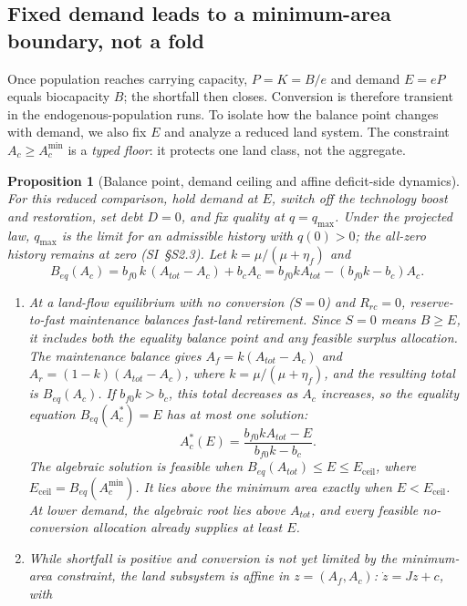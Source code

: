 \documentclass[preprint,12pt,authoryear]{elsarticle}
\newtheorem{proposition}{Proposition}
\newcommand{\Eceil}{E_{\mathrm{ceil}}}
\newcommand{\Acmin}{A_c^{\min}}
\begin{document}
\subsection{Fixed demand leads to a minimum-area boundary, not a fold}\label{sec:ceiling}

Once population reaches carrying capacity, $P=K=B/e$ and demand $E=eP$ equals biocapacity $B$; the shortfall then closes. Conversion is therefore transient in the endogenous-population runs. To isolate how the balance point changes with demand, we also fix $E$ and analyze a reduced land system. The constraint $A_c\ge\Acmin$ is a \emph{typed floor}: it protects one land class, not the aggregate.

\begin{proposition}[Balance point, demand ceiling and affine deficit-side dynamics]\label{prop:ceiling}
For this reduced comparison, hold demand at $E$, switch off the technology boost and restoration, set debt $D=0$, and fix quality at $q=q_{\max}$. Under the projected law, $q_{\max}$ is the limit for an admissible history with $q(0)>0$; the all-zero history remains at zero (SI~\S S2.3). Let $k=\mu/(\mu+\eta_f)$ and
\begin{equation}\label{eq:Beq}
B_{eq}(A_c)=b_{f0}\,k\,(A_{tot}-A_c)+b_cA_c=b_{f0}kA_{tot}-(b_{f0}k-b_c)A_c .
\end{equation}
\begin{enumerate}[label=(\roman*)]
\item At a land-flow equilibrium with no conversion ($S=0$) and $R_{rc}=0$, reserve-to-fast maintenance balances fast-land retirement. Since $S=0$ means $B\ge E$, it includes both the equality balance point and any feasible surplus allocation. The maintenance balance gives $A_f=k(A_{tot}-A_c)$ and $A_r=(1-k)(A_{tot}-A_c)$, where $k=\mu/(\mu+\eta_f)$, and the resulting total is $B_{eq}(A_c)$. If $b_{f0}k>b_c$, this total decreases as $A_c$ increases, so the equality equation $B_{eq}(A_c^*)=E$ has at most one solution:
\begin{equation}\label{eq:Acstar}
A_c^*(E)=\frac{b_{f0}kA_{tot}-E}{b_{f0}k-b_c}.
\end{equation}
The algebraic solution is feasible when $B_{eq}(A_{tot})\le E\le\Eceil$, where $\Eceil=B_{eq}(\Acmin)$. It lies above the minimum area exactly when $E<\Eceil$. At lower demand, the algebraic root lies above $A_{tot}$, and every feasible no-conversion allocation already supplies at least $E$.
\item While shortfall is positive and conversion is not yet limited by the minimum-area constraint, the land subsystem is affine in $z=(A_f,A_c)$: $\dot z=Jz+c$, with

\end{enumerate}
\end{proposition}
\end{document}
